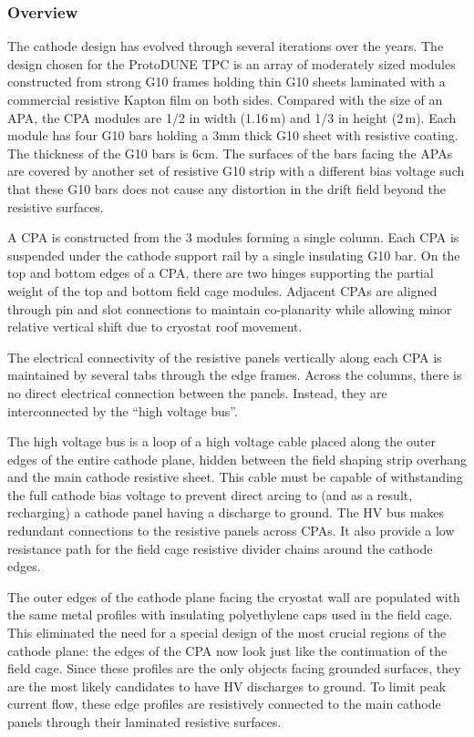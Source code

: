 \subsubsection{Overview}

The cathode design has evolved through several iterations over the years.  The design chosen for the ProtoDUNE TPC is an array of moderately sized modules constructed from strong G10 frames holding thin G10 sheets laminated with a commercial resistive Kapton film on both sides.   Compared with the size of an APA, the CPA modules are 1/2 in width (1.16\,m) and 1/3 in height (2\,m).   Each module has four G10 bars holding a 3mm thick G10 sheet with resistive coating.  The thickness of the G10 bars is 6cm.  The surfaces of the bars facing the APAs are covered by another set of resistive G10 strip with a different bias voltage such that these G10 bars does not cause any distortion in the drift field beyond the resistive surfaces.

A CPA is constructed from the 3 modules forming a single column.  Each CPA is suspended under the cathode support rail by a single insulating G10 bar.  On the top and bottom edges of a CPA, there are two hinges supporting the partial weight of the top and bottom field cage modules.   Adjacent CPAs are aligned through pin and slot connections to maintain co-planarity while allowing minor relative vertical shift due to cryostat roof movement.

The electrical connectivity of the resistive panels vertically along each CPA is maintained by several tabs through the edge frames.  Across the columns, there is no direct electrical connection between the panels.  Instead, they are interconnected by the ``high voltage bus''. 

The high voltage bus is a loop of a high voltage cable placed along the outer edges of the entire cathode plane, hidden between the field shaping strip overhang and the main cathode resistive sheet.  This cable must be capable of withstanding the full cathode bias voltage to prevent direct arcing to (and as a result, recharging) a cathode panel having a discharge to ground. The HV bus makes redundant connections to the resistive panels across CPAs.  It also provide a low resistance path for the field cage resistive divider chains around the cathode edges.

The outer edges of the cathode plane facing the cryostat wall are populated with the same metal profiles with insulating polyethylene caps used in the field cage.  This eliminated the need for a special design of the most crucial regions of the cathode plane: the edges of the CPA now look just like the continuation of the field cage.  Since these profiles are the only objects facing grounded surfaces, they are the most likely candidates to have HV discharges to ground.   To limit peak current flow, these edge profiles are resistively connected to the main cathode panels through their laminated resistive surfaces.  


